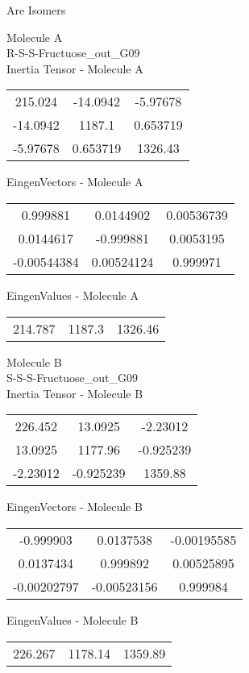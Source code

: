 \begin{center}
\vtab
\vtab
\textcolor{NavyBlue}{\Large Are Isomers}
\end{center}
\newpage
\begin{multicols}{2}
\begin{center}
Molecule A \\ 
R-S-S-Fructuose\_out\_G09
\\
Inertia Tensor - Molecule A \\
\vtab
\begin{tabular}{|c c c|}
215.024	 & 	-14.0942	 & 	-5.97678	 \\
-14.0942	 & 	1187.1	 & 	0.653719	 \\
-5.97678	 & 	0.653719	 & 	1326.43
\end{tabular}

\vtab
 EingenVectors - Molecule A     \\
\vtab
\begin{tabular}{|c c c|}
0.999881	 & 	0.0144902	 & 	0.00536739	 \\
0.0144617	 & 	-0.999881	 & 	0.0053195	 \\
-0.00544384	 & 	0.00524124	 & 	0.999971
\end{tabular}

\vtab
 EingenValues - Molecule A     \\
\vtab
\begin{tabular}{|c c c|}
214.787	 & 	1187.3	 & 	1326.46
\end{tabular}
\columnbreak

Molecule B \\ 
S-S-S-Fructuose\_out\_G09
\\
Inertia Tensor - Molecule B \\
\vtab
\begin{tabular}{|c c c|}
226.452	 & 	13.0925	 & 	-2.23012	 \\
13.0925	 & 	1177.96	 & 	-0.925239	 \\
-2.23012	 & 	-0.925239	 & 	1359.88
\end{tabular}

\vtab
 EingenVectors - Molecule B     \\
\vtab
\begin{tabular}{|c c c|}
-0.999903	 & 	0.0137538	 & 	-0.00195585	 \\
0.0137434	 & 	0.999892	 & 	0.00525895	 \\
-0.00202797	 & 	-0.00523156	 & 	0.999984
\end{tabular}

\vtab
 EingenValues - Molecule B     \\
\vtab
\begin{tabular}{|c c c|}
226.267	 & 	1178.14	 & 	1359.89
\end{tabular}

\end{center}
\end{multicols}

